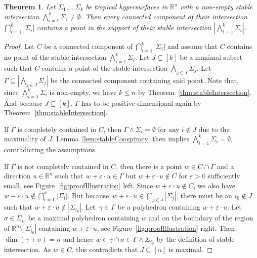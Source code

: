 \documentclass[11pt]{article}
\newtheorem{theorem}[theo]{Theorem}
\theoremstyle{definition}
\numberwithin{equation}{section}
\newcommand{\RR}{\mathbb{R}}
\begin{document}
\begin{theorem}\label{thm:main}
  Let $\Sigma_1,\dots\Sigma_k$ be tropical hypersurfaces in $\RR^n$ with a non-empty stable intersection $\bigwedge_{i=1}^k\Sigma_i\neq\emptyset$. Then every connected component of their intersection $\bigcap_{i=1}^k|\Sigma_i|$ contains a point in the support of their stable intersection $|\bigwedge_{i=1}^k\Sigma_i|$.
\end{theorem}
\begin{proof}
  Let $C$ be a connected component of $\bigcap_{i=1}^k|\Sigma_i|$ and assume that $C$ contains no point of the stable intersection $\bigwedge_{i=1}^k\Sigma_i$.
  Let $J\subsetneq [k]$ be a maximal subset such that $C$ contains a point of the stable intersection $\bigwedge_{j\in J}\Sigma_j$.
  Let $\Gamma\subseteq|\bigwedge_{j\in J}\Sigma_j|$ be the connected component containing said point. Note that, since $\bigwedge_{i=1}^k\Sigma_i$ is non-empty, we have $k\leq n$ by Theorem~\ref{thm:stableIntersection}.  And because $J\subsetneq [k]$, $\Gamma$ has to be positive dimensional again by Theorem~\ref{thm:stableIntersection}.

  If $\Gamma$ is completely contained in $C$, then $\Gamma\wedge\Sigma_i=\emptyset$ for any $i\notin J$ due to the maximality of $J$. Lemma~\ref{lem:stableConspiracy} then implies $\bigwedge_{i=1}^k \Sigma_i=\emptyset$, contradicting the assumptions.

  If $\Gamma$ is not completely contained in $C$, then there is a point $w\in C\cap\Gamma$ and a direction $u\in\RR^n$ such that $w+\varepsilon\cdot u\in\Gamma$ but $w+\varepsilon\cdot u\notin C$ for $\varepsilon>0$ sufficiently small, see Figure~\ref{fig:proofIllustration} left. Since $w+\varepsilon\cdot u\notin C$, we also have $w+\varepsilon\cdot u\notin\bigcap_{i=1}^k|\Sigma_i|$. But because~$w+\varepsilon\cdot u\in \bigcap_{j\in J}|\Sigma_j|$, there must be an $i_0\notin J$ such that $w+\varepsilon\cdot u\notin|\Sigma_{i_0}|$. Let~$\gamma\in\Gamma$ be a polyhedron containing $w+\varepsilon\cdot u$. Let~$\sigma\in\Sigma_{i_0}$ be a maximal polyhedron containing $w$ and on the boundary of the region of $\RR^n\setminus|\Sigma_{i_0}|$ containing $w+\varepsilon\cdot u$, see Figure~\ref{fig:proofIllustration} right. Then  $\dim(\gamma+\sigma)=n$ and hence $w\in\gamma\cap\sigma\in\Gamma\wedge\Sigma_{i_0}$ by the definition of stable intersection. As $w\in C$, this contradicts that $J\subseteq[n]$ is maximal.
\end{proof}
\end{document}

